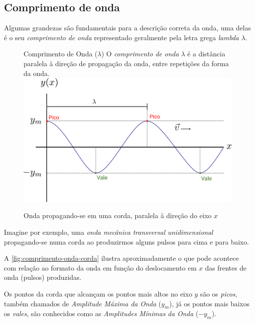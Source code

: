  \subsection*{Comprimento de onda}

Algumas grandezas são fundamentais para a descrição correta da onda, uma delas é o seu \emph{comprimento de onda} representado geralmente pela letra grega \emph{lambda} $\lambda$.

 \setlength\intextsep{-20pt}
 \begin{figure}
    \centering
    \begin{mybox}[colback=white, colframe=deepred,colbacktitle=deepred!85!deepred,]{Comprimento de Onda ($\lambda$)}
        O \emph{comprimento de onda} $\lambda$ é a distância paralela à direção de propagação da onda, entre repetições da forma da onda.
        \tcblower
        \includegraphics[width=1\textwidth]{img/lambda-1.png}
        \caption{Onda propagando-se em uma corda, paralela à direção do eixo $x$}
        \label{fig:comprimento-onda-corda} 
    \end{mybox}            
 \end{figure}

\noindent Imagine por exemplo, uma \emph{onda mecânica transversal unidimensional} propagando-se numa corda ao produzirmos alguns pulsos para cima e para baixo.

\noindent A \autoref{fig:comprimento-onda-corda} ilustra aproximadamente o que pode acontece com relação ao formato da onda em função do deslocamento em $x$ das frentes de onda (pulsos) produzidas.

\noindent Os pontos da corda que alcançam os pontos mais altos no eixo $y$ são os \emph{picos}, também chamados de \emph{Amplitude Máxima da Onda} ($y_m$), já os pontos mais baixos os \emph{vales}, são conhecidos como as \emph{Amplitudes Mínimas da Onda} ($-y_m$).

